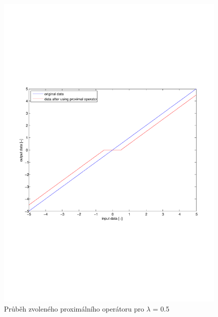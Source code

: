 \documentclass[FM,BP]{tulthesis}
\begin{document}
\begin{figure}[!ht]
\begin{center}
\includegraphics[scale=0.55]{obr/threshhold.pdf}
\end{center}
\caption{Průběh zvoleného proximálního operátoru pro $\lambda$ = 0.5}
\label{fig:threshhold}
\end{figure}
\end{document}
